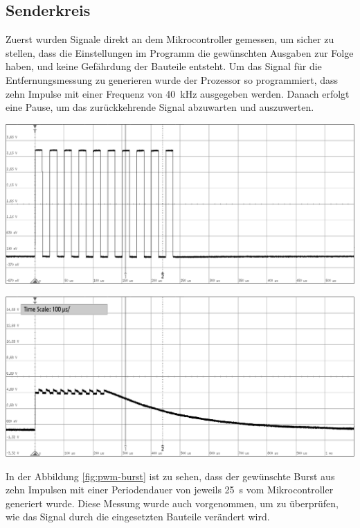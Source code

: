 \subsection{Senderkreis}
Zuerst wurden Signale direkt an dem Mikrocontroller gemessen, um sicher zu stellen, dass die Einstellungen im Programm die gewünschten Ausgaben zur Folge haben, und keine Gefährdung der Bauteile entsteht.
Um das Signal für die Entfernungsmessung zu generieren wurde der Prozessor so programmiert, dass zehn Impulse mit einer Frequenz von 40~kHz ausgegeben werden. Danach erfolgt eine Pause, um das zurückkehrende Signal abzuwarten und auszuwerten.\\
\begin{minipage}{0.5\textwidth}
\includegraphics[width=1\textwidth%
]{Abbildungen/MessungenP1/PWM-von-der-cpu.png}
\label{fig:pwm-burst}
\end{minipage}
\begin{minipage}{0.5\textwidth}
\includegraphics[width=1\textwidth%
]{Abbildungen/MessungenP1/PWM-ausgabe-mit-Hi-Side.png}
\label{fig:HiSide}
\end{minipage}
In der Abbildung \ref{fig:pwm-burst} ist zu sehen, dass der gewünschte Burst aus zehn Impulsen mit einer Periodendauer von jeweils 25~\textmu s vom Mikrocontroller generiert wurde. Diese Messung wurde auch vorgenommen, um zu überprüfen, wie das Signal durch die eingesetzten Bauteile verändert wird.\\
